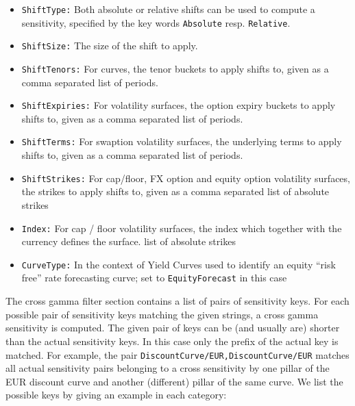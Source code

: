 \documentclass[12pt, a4paper]{article}
\begin{document}
\begin{itemize}
\item {\tt ShiftType:} Both absolute or relative shifts can be used to compute a sensitivity, specified by the key words
  {\tt Absolute} resp. {\tt Relative}.
\item {\tt ShiftSize:} The size of the shift to apply.
\item {\tt ShiftTenors:} For curves, the tenor buckets to apply shifts to, given as a comma separated list of periods.
\item {\tt ShiftExpiries:} For volatility surfaces, the option expiry buckets to apply shifts to, given as a comma
  separated list of periods.
\item {\tt ShiftTerms:} For swaption volatility surfaces, the underlying terms to apply shifts to, given as a comma
  separated list of periods.
\item {\tt ShiftStrikes:} For cap/floor, FX option and equity option volatility surfaces, the strikes to apply shifts to, given as a comma separated
  list of absolute strikes
\item {\tt Index:} For cap / floor volatility surfaces, the index which together with the currency defines the surface.
  list of absolute strikes
\item {\tt CurveType:} In the context of Yield Curves used to identify an equity ``risk free'' rate forecasting curve; set to {\tt EquityForecast} in this case
\end{itemize}

The cross gamma filter section contains a list of pairs of sensitivity keys. For each possible pair of sensitivity keys
matching the given strings, a cross gamma sensitivity is computed. The given pair of keys can be (and usually are)
shorter than the actual sensitivity keys. In this case only the prefix of the actual key is matched. For example, the
pair {\tt DiscountCurve/EUR,DiscountCurve/EUR} matches all actual sensitivity pairs belonging to a cross sensitivity by
one pillar of the EUR discount curve and another (different) pillar of the same curve. We list the possible keys by
giving an example in each category:
\end{document}
